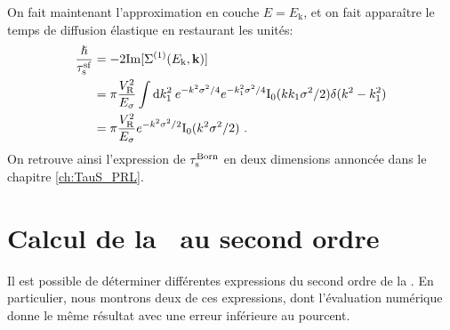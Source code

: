 On fait maintenant l'approximation en couche $E=E_{\mathrm{k}}$, et on fait apparaître le temps de diffusion élastique en restaurant les unités:
\begin{align}
\frac{\hslash}{\tau_{\mathrm{s}}^{\mathrm{sf}}}&=-2\mathrm{Im}[\Sigma^{(1)}(E_{\mathrm{k}},\mathbf{k})] \\
&= \pi \frac{V_{\mathrm{R}}^2}{E_{\sigma}} \int{\mathop{}\mathopen{}\mathrm{d}k_{\mathrm{1}}^2 \: e^{-k^2\sigma^2 /4} e^{-k_{\mathrm{1}}^2\sigma^2/4} \mathrm{I_0}(k k_{\mathrm{1}} \sigma^2 /2) \delta(k^2-k_{\mathrm{1}}^2)} \\
&= \pi \frac{V_{\mathrm{R}}^2}{E_{\sigma}} e^{-k^2\sigma^2/2} \mathrm{I_0}(k^2\sigma^2/2) \text{ .}
\end{align}
On retrouve ainsi l'expression de $\tau_{\mathrm{s}}^{\mathrm{Born}}$ en deux dimensions annoncée dans le chapitre \ref{ch:TauS_PRL}.






\section{Calcul de la \selfenergy\ au second ordre}
Il est possible de déterminer différentes expressions du second ordre de la \selfenergy . En particulier, nous montrons deux de ces expressions, dont l'évaluation numérique donne le même résultat avec une erreur inférieure au pourcent. 

